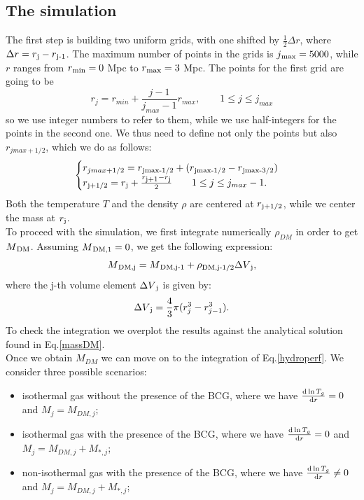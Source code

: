 \documentclass{article}
\begin{document}
\subsection{The simulation}
The first step is building two uniform grids, with one shifted by $\frac{1}{2}\Delta r$, where $\Delta r=r\textsubscript{j}-r\textsubscript{j-1}$. The maximum number of points in the grids is $j\textsubscript{max}=5000$, while $r$ ranges from $r\textsubscript{min}=0 $ Mpc to $r\textsubscript{max}=3 $ Mpc.
The points for the first grid are going to be
\begin{equation}
	r_{j}=r_{min}+\frac{j-1}{j_{max}-1}r_{max},\qquad 1\le j\le j_{max}
\end{equation}
so we use integer numbers to refer to them, while we use half-integers for the points in the second one.
We thus need to define not only the points but also $r_{jmax+1/2}$, which we do as follows:
\begin{equation}
	\begin{cases}
		r_{jmax+1/2}=r\textsubscript{jmax-1/2}+(r\textsubscript{jmax-1/2}-r\textsubscript{jmax-3/2})\\
		r\textsubscript{j+1/2}=r\textsubscript{j}+\frac{r\textsubscript{j+1}-r\textsubscript{j}}{2} \qquad 1\le j\le j_{max}-1.
	\end{cases}
\end{equation}
Both the temperature $T$ and the density $\rho$ are centered at $r\textsubscript{j+1/2}$, while we center the mass at $r\textsubscript{j}$.\\
To proceed with the simulation, we first integrate numerically $\rho_{DM}$ in order to get $M\textsubscript{DM}$.
Assuming $ M\textsubscript{DM,1}=0$, we get the following expression:
\begin{equation}
	M\textsubscript{DM,j}=M\textsubscript{DM,j-1}+\rho\textsubscript{DM,j-1/2}\Delta V\textsubscript{j},
\end{equation}
where the j-th volume element $\Delta V\textsubscript{j}$ is given by:
\begin{equation}
	\Delta V\textsubscript{j}=\frac{4}{3}\pi(r^{3}_{j}-r^{3}_{j-1}).
\end{equation}
To check the integration we overplot the results against the analytical solution found in Eq.\eqref{massDM}.\\
Once we obtain $M_{DM}$ we can move on to the integration of Eq.\eqref{hydroperf}. We consider three possible scenarios:
\begin{itemize}
	\item isothermal gas without the presence of the BCG, where we have $\derivative{\ln T_{g}}{r}=0$ and $M_{j}=M_{DM,j}$;
	\item isothermal gas with the presence of the BCG, where we have $\derivative{\ln T_{g}}{r}=0$ and $M_{j}=M_{DM,j}+M_{*,j}$;
	\item non-isothermal gas with the presence of the BCG, where we have $\derivative{\ln T_{g}}{r}\ne 0$ and $M_{j}=M_{DM,j}+M_{*,j}$;
\end{itemize}
\end{document}
